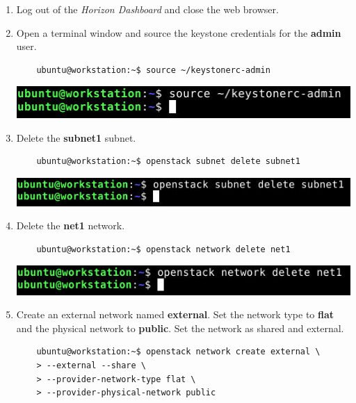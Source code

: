 \documentclass[letterpaper, 12pt]{article}
\begin{document}
\begin{enumerate}
    \item Log out of the \textit{Horizon Dashboard} and close the web browser.
    
    \item Open a terminal window and source the keystone credentials for the \textbf{admin} user.
    \begin{lstlisting}
    ubuntu@workstation:~$ source ~/keystonerc-admin
    \end{lstlisting}

    \begin{center}
        \includegraphics[width=\linewidth]{images/part1/step9.png}
    \end{center}

    \item Delete the \textbf{subnet1} subnet.
    \begin{lstlisting}
    ubuntu@workstation:~$ openstack subnet delete subnet1
    \end{lstlisting}

    \begin{center}
        \includegraphics[width=\linewidth]{images/part1/step10.png}
    \end{center}

    \item Delete the \textbf{net1} network.
    \begin{lstlisting}
    ubuntu@workstation:~$ openstack network delete net1
    \end{lstlisting}

    \begin{center}
        \includegraphics[width=\linewidth]{images/part1/step11.png}
    \end{center}

    \item Create an external network named \textbf{external}. Set the network type to \textbf{flat} and the physical
    network to \textbf{public}. Set the network as shared and external.
    \begin{lstlisting}
    ubuntu@workstation:~$ openstack network create external \
    > --external --share \
    > --provider-network-type flat \
    > --provider-physical-network public
    \end{lstlisting}


\end{enumerate}
\end{document}
